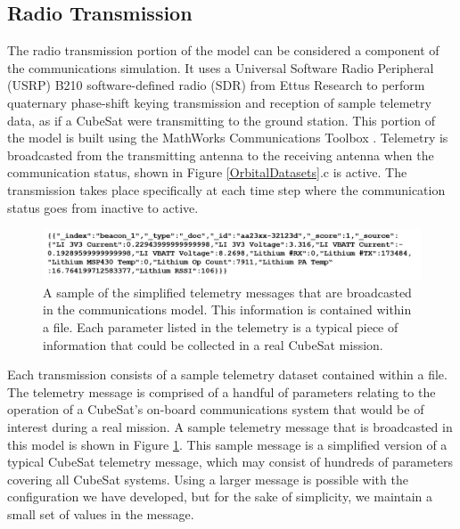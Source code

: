 \documentclass[conf]{new-aiaa}
\begin{document}
\subsection{Radio Transmission}

The radio transmission portion of the model can be considered a component of the communications simulation. It uses a Universal Software Radio Peripheral (USRP) B210 software-defined radio (SDR) from Ettus Research to perform quaternary phase-shift keying transmission and reception of sample telemetry data, as if a CubeSat were transmitting to the ground station. This portion of the model is built using the MathWorks Communications Toolbox \cite{CommunicationsToolbox}. Telemetry is broadcasted from the transmitting antenna to the receiving antenna when the communication status, shown in Figure \ref{OrbitalDatasets}.c is active. The transmission takes place specifically at each time step where the communication status goes from inactive to active.

\begin{figure}[!ht]
\centering
\includegraphics[width=1\textwidth]{Fig/SampleTelemetry.png}
\caption{A sample of the simplified telemetry messages that are broadcasted in the communications model. This information is contained within a file. Each parameter listed in the telemetry is a typical piece of information that could be collected in a real CubeSat mission.}
\label{SampleTelemetry}
\end{figure}

Each transmission consists of a sample telemetry dataset contained within a file. The telemetry message is comprised of a handful of parameters relating to the operation of a CubeSat's on-board communications system that would be of interest during a real mission. A sample telemetry message that is broadcasted in this model is shown in Figure \ref{SampleTelemetry}. This sample message is a simplified version of a typical CubeSat telemetry message, which may consist of hundreds of parameters covering all CubeSat systems. Using a larger message is possible with the configuration we have developed, but for the sake of simplicity, we maintain a small set of values in the message.
\end{document}
